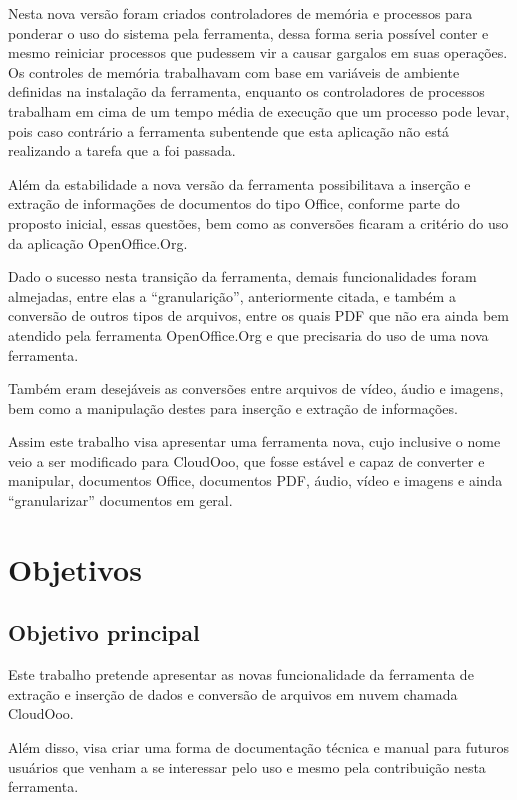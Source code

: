 Nesta nova versão foram criados controladores de memória e processos para ponderar o uso do sistema pela ferramenta, dessa forma seria possível conter e mesmo reiniciar processos que pudessem vir a causar gargalos em suas operações. Os controles de memória trabalhavam com base em variáveis de ambiente definidas na instalação da ferramenta, enquanto os controladores de processos trabalham em cima de um tempo média de execução que um processo pode levar, pois caso contrário a ferramenta subentende que esta aplicação não está realizando a tarefa que a foi passada.

Além da estabilidade a nova versão da ferramenta possibilitava a inserção e extração de informações de documentos do tipo Office, conforme parte do proposto inicial, essas questões, bem como as conversões ficaram a critério do uso da aplicação OpenOffice.Org.

Dado o sucesso nesta transição da ferramenta, demais funcionalidades foram almejadas, entre elas a ``granularição'', anteriormente citada, e também a conversão de outros tipos de arquivos, entre os quais PDF que não era ainda bem atendido pela ferramenta OpenOffice.Org e que precisaria do uso de uma nova ferramenta.

Também eram desejáveis as conversões entre arquivos de vídeo, áudio e imagens, bem como a manipulação destes para inserção e extração de informações.

Assim este trabalho visa apresentar uma ferramenta nova, cujo inclusive o nome veio a ser modificado para CloudOoo, que fosse estável e capaz de converter e manipular, documentos Office, documentos PDF, áudio, vídeo e imagens e ainda ``granularizar'' documentos em geral.


\section{Objetivos}

\subsection{Objetivo principal}

Este trabalho pretende apresentar as novas funcionalidade da ferramenta de extração e inserção de dados e conversão de arquivos em nuvem chamada CloudOoo.

Além disso, visa criar uma forma de documentação técnica e manual para futuros usuários que venham a se interessar pelo uso e mesmo pela contribuição nesta ferramenta.

